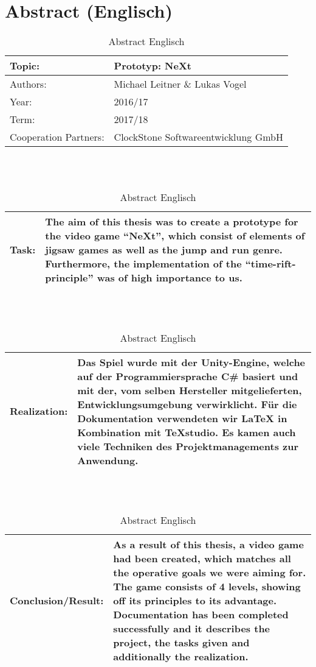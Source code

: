 \chapter*{Abstract (Englisch)}
\begin{table}[H]
	
	\renewcommand{\arraystretch}{1.5}
	\begin{tabular}{|p{4cm}|p{10cm}|}
		\hline 
		Topic: &  Prototyp: NeXt\\ 
		\hline
		Authors: & Michael Leitner \& Lukas Vogel  \\ 
		\hline 
		Year: & 2016/17 \\
		\hline
		Term: & 2017/18 \\
		\hline 
		Cooperation Partners: & ClockStone Softwareentwicklung GmbH\\
		\hline
	\end{tabular}
	\ \\
	\ \\
	\begin{tabular}{|p{4cm}|p{10cm}|}
		\hline
		Task: & The aim of this thesis was to create a prototype for the video game “NeXt”, which consist of elements of jigsaw games as well as the jump and run genre. Furthermore, the implementation of the “time-rift-principle” was of high importance to us.\\
		\hline
	\end{tabular} 
	\ \\
	\ \\
	\begin{tabular}{|p{4cm}|p{10cm}|}
		\hline
		Realization: & Das Spiel wurde mit der Unity-Engine, welche auf der
		Programmiersprache C\# basiert und mit der, vom selben Hersteller mitgelieferten, Entwicklungsumgebung verwirklicht. Für die Dokumentation verwendeten wir LaTeX in Kombination mit TeXstudio. Es kamen auch viele Techniken des Projektmanagements zur Anwendung.\\
		\hline
	\end{tabular}
	\ \\
	\ \\
	\begin{tabular}{|p{4cm}|p{10cm}|}
		\hline
		Conclusion/Result: & As a result of this thesis, a video game had been created, which	matches all the operative goals we were aiming for. The game consists of 4 levels, showing off its principles to its advantage. Documentation has been completed successfully and it describes the project, the tasks given and additionally the realization. \\
		\hline
	\end{tabular}
	\caption{Abstract Englisch}
\end{table}